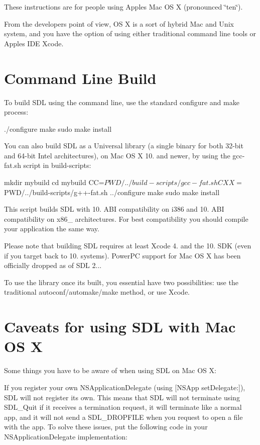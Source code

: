 These instructions are for people using Apple\textquotesingle{}s Mac OS X (pronounced \char`\"{}ten\char`\"{}).

From the developer\textquotesingle{}s point of view, OS X is a sort of hybrid Mac and Unix system, and you have the option of using either traditional command line tools or Apple\textquotesingle{}s I\+DE Xcode.

\section*{Command Line Build }

To build S\+DL using the command line, use the standard configure and make process\+: \begin{DoxyVerb}./configure
make
sudo make install
\end{DoxyVerb}


You can also build S\+DL as a Universal library (a single binary for both 32-\/bit and 64-\/bit Intel architectures), on Mac OS X 10. and newer, by using the gcc-\/fat.\+sh script in build-\/scripts\+: \begin{DoxyVerb}mkdir mybuild
cd mybuild
CC=$PWD/../build-scripts/gcc-fat.sh CXX=$PWD/../build-scripts/g++-fat.sh ../configure
make
sudo make install
\end{DoxyVerb}


This script builds S\+DL with 10. A\+BI compatibility on i386 and 10. A\+BI compatibility on x86\+\_ architectures. For best compatibility you should compile your application the same way.

Please note that building S\+DL requires at least Xcode 4. and the 10. S\+DK (even if you target back to 10. systems). Power\+PC support for Mac OS X has been officially dropped as of S\+DL 2...

To use the library once it\textquotesingle{}s built, you essential have two possibilities\+: use the traditional autoconf/automake/make method, or use Xcode. 

 \section*{Caveats for using S\+DL with Mac OS X }

Some things you have to be aware of when using S\+DL on Mac OS X\+:


\begin{DoxyItemize}
\item If you register your own N\+S\+Application\+Delegate (using \mbox{[}N\+S\+App set\+Delegate\+:\mbox{]}), S\+DL will not register its own. This means that S\+DL will not terminate using S\+D\+L\+\_\+\+Quit if it receives a termination request, it will terminate like a normal app, and it will not send a S\+D\+L\+\_\+\+D\+R\+O\+P\+F\+I\+LE when you request to open a file with the app. To solve these issues, put the following code in your N\+S\+Application\+Delegate implementation\+:
\end{DoxyItemize}

